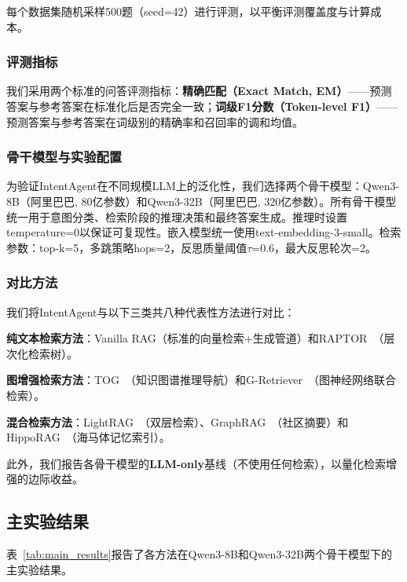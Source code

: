 \documentclass[runningheads]{llncs}
\begin{document}
每个数据集随机采样500题（seed=42）进行评测，以平衡评测覆盖度与计算成本。

\subsubsection{评测指标}

我们采用两个标准的问答评测指标：\textbf{精确匹配（Exact Match, EM）}——预测答案与参考答案在标准化后是否完全一致；\textbf{词级F1分数（Token-level F1）}——预测答案与参考答案在词级别的精确率和召回率的调和均值。

\subsubsection{骨干模型与实验配置}

为验证IntentAgent在不同规模LLM上的泛化性，我们选择两个骨干模型：Qwen3-8B（阿里巴巴, 80亿参数）和Qwen3-32B（阿里巴巴, 320亿参数）。所有骨干模型统一用于意图分类、检索阶段的推理决策和最终答案生成。推理时设置temperature=0以保证可复现性。嵌入模型统一使用text-embedding-3-small。检索参数：top-k=5，多跳策略hops=2，反思质量阈值$\tau$=0.6，最大反思轮次=2。

\subsubsection{对比方法}

我们将IntentAgent与以下三类共八种代表性方法进行对比：

\textbf{纯文本检索方法}：Vanilla RAG（标准的向量检索+生成管道）和RAPTOR~\cite{ref23}（层次化检索树）。

\textbf{图增强检索方法}：TOG~\cite{ref24}（知识图谱推理导航）和G-Retriever~\cite{ref25}（图神经网络联合检索）。

\textbf{混合检索方法}：LightRAG~\cite{ref26}（双层检索）、GraphRAG~\cite{ref27}（社区摘要）和HippoRAG~\cite{ref28}（海马体记忆索引）。

此外，我们报告各骨干模型的\textbf{LLM-only}基线（不使用任何检索），以量化检索增强的边际收益。

\subsection{主实验结果}

表~\ref{tab:main_results}报告了各方法在Qwen3-8B和Qwen3-32B两个骨干模型下的主实验结果。
\end{document}
